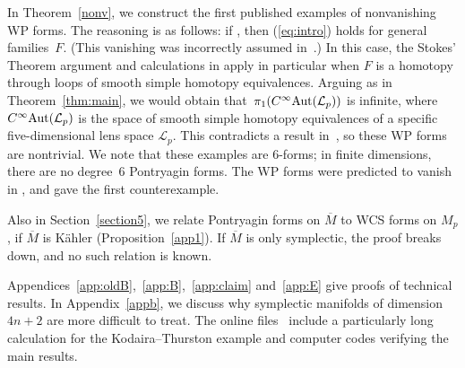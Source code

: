 \documentclass[pdftex]{sigma}
\numberwithin{equation}{section}
\theoremstyle{definition}
\newcommand{\ocs}{\widetilde{{\rm CS}}}
\newcommand{\om}{\overline{M}}
\begin{document}
In Theorem~\ref{nonv}, we construct the first published examples of nonvanishing WP forms. The reasoning is as follows: if
\smash{$0= {\rm d}_{LM}\ocs{}^{\rm W}_{2k-1} \in \Lambda^{2k}(LM)$}, then (\ref{eq:intro}) holds for general families~$F$. (This vanishing was incorrectly assumed in~\cite{MRT4}.) In this case, the Stokes' Theorem argument and calculations in \cite[Section~3]{MRT4} apply in particular when $F$ is a homotopy through loops of smooth simple homotopy equivalences. Arguing as in Theorem~\ref{thm:main}, we would obtain that~$\pi_1(C^\infty{\rm Aut}(\mathcal{L}_p))$ is infinite, where $C^\infty{\rm Aut}(\mathcal{L}_p)$ is the space of smooth simple homotopy equivalences of a specific
five-dimensional lens space $\mathcal{L}_p$. This contradicts a result in~\cite{HJ}, so these WP forms are nontrivial. We note that these examples are $6$-forms; in finite dimensions, there are no degree~$6$ Pontryagin forms. The WP forms were predicted to vanish in \cite{lrst}, and \cite{alh-unpublished} gave the first counterexample.

Also in Section~\ref{section5}, we relate Pontryagin forms on $\om$ to WCS forms on
$M_p$, if $\om$ is K\"ahler (Proposition~\ref{app1}). If $\om$ is only symplectic, the proof breaks down, and no such relation is known.

Appendices~\ref{app:oldB},~\ref{app:B},~\ref{app:claim} and~\ref{app:E} give proofs of technical results. In Appendix~\ref{appb},
we discuss why symplectic manifolds of dimension $4n+2$ are more difficult to treat. The online files~\cite{Egi1, Egi3} include a particularly long calculation for the Kodaira--Thurston example and computer codes verifying the main results.
\end{document}
